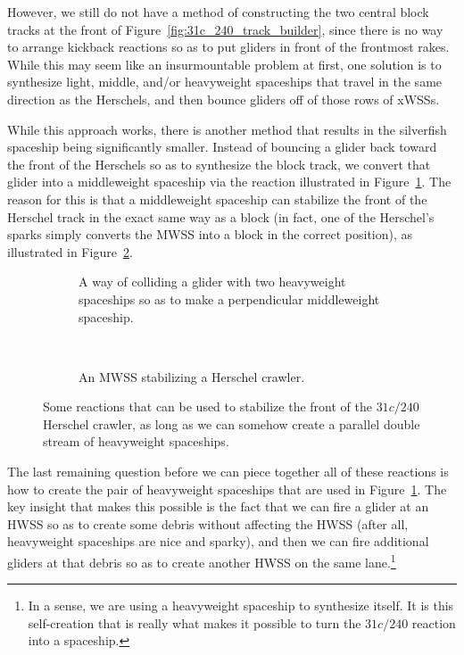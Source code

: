 However, we still do not have a method of constructing the two central block tracks at the front of Figure~\ref{fig:31c_240_track_builder}, since there is no way to arrange kickback reactions so as to put gliders in front of the frontmost rakes. While this may seem like an insurmountable problem at first, one solution is to synthesize light, middle, and/or heavyweight spaceships that travel in the same direction as the Herschels, and then bounce gliders off of those rows of xWSSs.

While this approach works, there is another method that results in the silverfish spaceship being significantly smaller. Instead of bouncing a glider back toward the front of the Herschels so as to synthesize the block track, we convert that glider into a middleweight spaceship via the reaction illustrated in Figure~\ref{fig:g_2h_to_m}. The reason for this is that a middleweight spaceship can stabilize the front of the Herschel track in the exact same way as a block (in fact, one of the Herschel's sparks simply converts the MWSS into a block in the correct position), as illustrated in Figure~\ref{fig:herschel_mwss_stabilize}.

\begin{figure}[!htb]
	\centering
	\begin{subfigure}[b]{0.43\textwidth}
		\centering
		\caption{A way of colliding a glider with two heavyweight spaceships so as to make a perpendicular middleweight spaceship.}\label{fig:g_2h_to_m}
	\end{subfigure} \ \	\ \ \ \begin{subfigure}[b]{0.53\textwidth}
		\centering
		\caption{An MWSS stabilizing a Herschel crawler.}\label{fig:herschel_mwss_stabilize}
	\end{subfigure}
	\caption{Some reactions that can be used to stabilize the front of the $31c/240$ Herschel crawler, as long as we can somehow create a parallel double stream of heavyweight spaceships.}\label{fig:silverfish_mwss_reactions}
\end{figure}

The last remaining question before we can piece together all of these reactions is how to create the pair of heavyweight spaceships that are used in Figure~\ref{fig:g_2h_to_m}. The key insight that makes this possible is the fact that we can fire a glider at an HWSS so as to create some debris without affecting the HWSS (after all, heavyweight spaceships are nice and sparky), and then we can fire additional gliders at that debris so as to create another HWSS on the same lane.\footnote{In a sense, we are using a heavyweight spaceship to synthesize itself. It is this self-creation that is really what makes it possible to turn the $31c/240$ reaction into a spaceship.}

